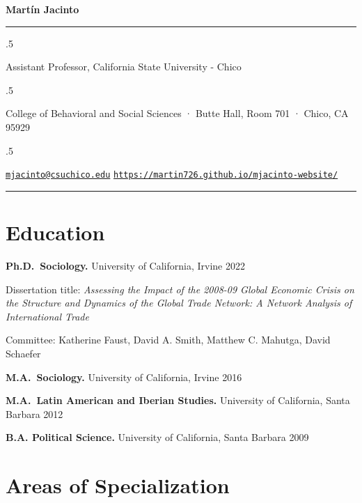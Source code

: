 \documentclass[10pt,]{article}
\renewenvironment{itemize}{
  \begin{list}{}{
    \setlength{\leftmargin}{1.5em}
  }
}{
  \end{list}
}
\begin{document}
\centerline{\huge \bf Martín Jacinto}

\vspace{2 mm}

\hrule

\vspace{2 mm}

\moveleft.5\hoffset\centerline{Assistant Professor, California State
University - Chico}
\moveleft.5\hoffset\centerline{College of Behavioral and Social Sciences
· Butte Hall, Room 701 · Chico, CA 95929}
\moveleft.5\hoffset\centerline{ \faEnvelopeO \hspace{1 mm} \href{mailto:}{\tt \href{mailto:mjacinto@csuchico.edu}{\nolinkurl{mjacinto@csuchico.edu}}} \hspace{1 mm}      \faGlobe \hspace{1 mm} \href{http://\url{https://martin726.github.io/mjacinto-website/}}{\tt \url{https://martin726.github.io/mjacinto-website/}}   } 

\vspace{2 mm}

\hrule


\hypertarget{education}{%
\section{Education}\label{education}}

\textbf{Ph.D.~Sociology.} University of California, Irvine \hfill 2022

\begin{itemize}
\item
  Dissertation title: \emph{Assessing the Impact of the 2008-09 Global
  Economic Crisis on the Structure and Dynamics of the Global Trade
  Network: A Network Analysis of International Trade}
\item
  Committee: Katherine Faust, David A. Smith, Matthew C. Mahutga, David
  Schaefer
\end{itemize}

\textbf{M.A.~Sociology.} University of California, Irvine \hfill 2016

\textbf{M.A.~Latin American and Iberian Studies.} University of
California, Santa Barbara \hfill 2012

\textbf{B.A. Political Science.} University of California, Santa Barbara
\hfill 2009

\hypertarget{areas-of-specialization}{%
\section{Areas of Specialization}\label{areas-of-specialization}}
\end{document}
